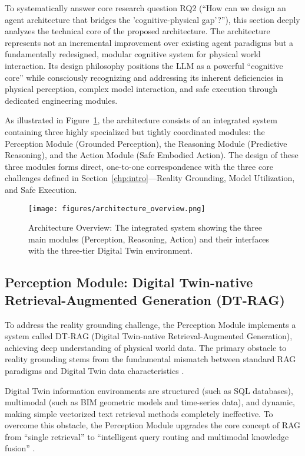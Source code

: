 To systematically answer core research question RQ2 (``How can we design an agent architecture that bridges the 'cognitive-physical gap'?''), this section deeply analyzes the technical core of the proposed architecture. The architecture represents not an incremental improvement over existing agent paradigms but a fundamentally redesigned, modular cognitive system for physical world interaction. Its design philosophy positions the LLM as a powerful ``cognitive core'' while consciously recognizing and addressing its inherent deficiencies in physical perception, complex model interaction, and safe execution through dedicated engineering modules.

As illustrated in Figure~\ref{fig:architecture_overview}, the architecture consists of an integrated system containing three highly specialized but tightly coordinated modules: the Perception Module (Grounded Perception), the Reasoning Module (Predictive Reasoning), and the Action Module (Safe Embodied Action). The design of these three modules forms direct, one-to-one correspondence with the three core challenges defined in Section~\ref{chp:intro}—Reality Grounding, Model Utilization, and Safe Execution.

\begin{figure}[htbp]
\centering
\texttt{[image: figures/architecture\_overview.png]}
\caption{Architecture Overview: The integrated system showing the three main modules (Perception, Reasoning, Action) and their interfaces with the three-tier Digital Twin environment.}
\label{fig:architecture_overview}
\end{figure}

\subsection{Perception Module: Digital Twin-native Retrieval-Augmented Generation (DT-RAG)}

To address the reality grounding challenge, the Perception Module implements a system called DT-RAG (Digital Twin-native Retrieval-Augmented Generation), achieving deep understanding of physical world data. The primary obstacle to reality grounding stems from the fundamental mismatch between standard RAG paradigms and Digital Twin data characteristics \cite{lewis2020retrieval}.

Digital Twin information environments are structured (such as SQL databases), multimodal (such as BIM geometric models and time-series data), and dynamic, making simple vectorized text retrieval methods completely ineffective. To overcome this obstacle, the Perception Module upgrades the core concept of RAG from ``single retrieval'' to ``intelligent query routing and multimodal knowledge fusion'' \cite{gao2023retrieval}.

